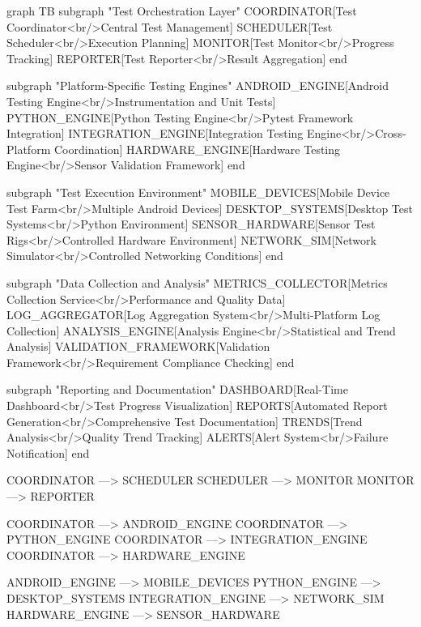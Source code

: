 \documentclass[11pt,a4paper]{report}
\begin{document}
    graph TB
        subgraph "Test Orchestration Layer"
            COORDINATOR[Test Coordinator<br/>Central Test Management]
            SCHEDULER[Test Scheduler<br/>Execution Planning]
            MONITOR[Test Monitor<br/>Progress Tracking]
            REPORTER[Test Reporter<br/>Result Aggregation]
        end

        subgraph "Platform-Specific Testing Engines"
            ANDROID\_ENGINE[Android Testing Engine<br/>Instrumentation and Unit Tests]
            PYTHON\_ENGINE[Python Testing Engine<br/>Pytest Framework Integration]
            INTEGRATION\_ENGINE[Integration Testing Engine<br/>Cross-Platform Coordination]
            HARDWARE\_ENGINE[Hardware Testing Engine<br/>Sensor Validation Framework]
        end

        subgraph "Test Execution Environment"
            MOBILE\_DEVICES[Mobile Device Test Farm<br/>Multiple Android Devices]
            DESKTOP\_SYSTEMS[Desktop Test Systems<br/>Python Environment]
            SENSOR\_HARDWARE[Sensor Test Rigs<br/>Controlled Hardware Environment]
            NETWORK\_SIM[Network Simulator<br/>Controlled Networking Conditions]
        end

        subgraph "Data Collection and Analysis"
            METRICS\_COLLECTOR[Metrics Collection Service<br/>Performance and Quality Data]
            LOG\_AGGREGATOR[Log Aggregation System<br/>Multi-Platform Log Collection]
            ANALYSIS\_ENGINE[Analysis Engine<br/>Statistical and Trend Analysis]
            VALIDATION\_FRAMEWORK[Validation Framework<br/>Requirement Compliance Checking]
        end

        subgraph "Reporting and Documentation"
            DASHBOARD[Real-Time Dashboard<br/>Test Progress Visualization]
            REPORTS[Automated Report Generation<br/>Comprehensive Test Documentation]
            TRENDS[Trend Analysis<br/>Quality Trend Tracking]
            ALERTS[Alert System<br/>Failure Notification]
        end

        COORDINATOR ---> SCHEDULER
        SCHEDULER ---> MONITOR
        MONITOR ---> REPORTER

        COORDINATOR ---> ANDROID\_ENGINE
        COORDINATOR ---> PYTHON\_ENGINE
        COORDINATOR ---> INTEGRATION\_ENGINE
        COORDINATOR ---> HARDWARE\_ENGINE

        ANDROID\_ENGINE ---> MOBILE\_DEVICES
        PYTHON\_ENGINE ---> DESKTOP\_SYSTEMS
        INTEGRATION\_ENGINE ---> NETWORK\_SIM
        HARDWARE\_ENGINE ---> SENSOR\_HARDWARE
\end{document}
